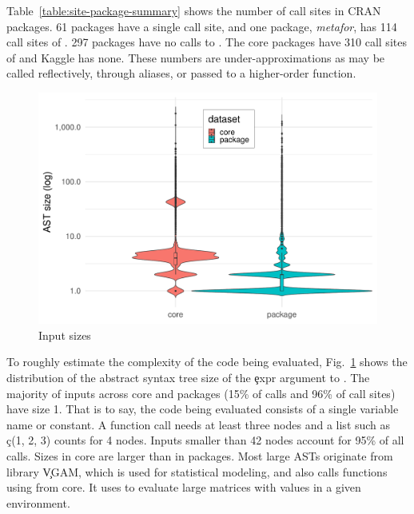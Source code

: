 \documentclass[conference]{IEEEtran}
\newcommand{\NbAstOnePercent}{15\%\xspace}
\newcommand{\NbAstOneCallSitePercent}{96\%\xspace}
\newcommand{\AstSizeNineFive}{42\xspace}
\newcommand{\NbCoreEvalCallSites}{310\xspace}
\newcommand{\MaxCallSitesEnrich}{114\xspace}
\newcommand{\OneCallSitesEnrich}{61\xspace}
\newcommand{\NoCallSitesEnrich}{297\xspace}
\begin{document}
Table~\ref{table:site-package-summary} shows the number of call sites in
CRAN packages. \OneCallSitesEnrich{} packages have a single call site, and one
package, \emph{metafor}, has \MaxCallSitesEnrich{} call sites of
\eval. \NoCallSitesEnrich{} packages have no calls to \eval. The core packages
have \NbCoreEvalCallSites{} call sites of \eval and Kaggle has none. These
numbers are under-approximations as \eval may be called reflectively,
through aliases, or passed to a higher-order function.


\begin{table}[ht]
\caption{Distribution of callsites in CRAN}
\label{table:site-package-summary}
\end{table}

\begin{figure}[!b]
	\centering
\includegraphics[width=\columnwidth]{ast_sizes}
\caption{Input sizes} \label{fig:ast-size}
\end{figure}

To roughly estimate the complexity of the code being evaluated,
Fig.~\ref{fig:ast-size} shows the distribution of the abstract syntax tree
size of the \c{expr} argument to \eval. The majority of inputs across core
and packages (\NbAstOnePercent of \eval calls and \NbAstOneCallSitePercent
of call sites) have size 1. That is to say, the code being evaluated
consists of a single variable name or constant. A function call needs at
least three nodes and a list such as \c{c(1, 2, 3)} counts for 4
nodes. Inputs smaller than \AstSizeNineFive nodes account for 95\% of all
calls. Sizes in core are larger than in packages. Most large ASTs originate
from library \c{VGAM}, which is used for statistical modeling, and also calls functions using \eval from core. It uses
\eval to evaluate large matrices with values in a given environment.
\end{document}
